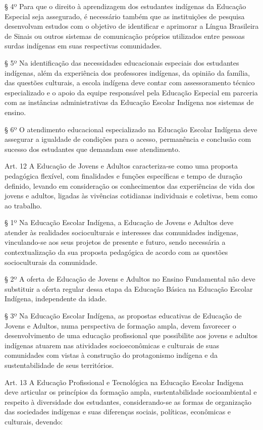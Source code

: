 \documentclass[
]{book}
\begin{document}
§ 4º Para que o direito à aprendizagem dos estudantes indígenas da Educação Especial seja assegurado, é necessário também que as instituições de pesquisa desenvolvam estudos com o objetivo de identificar e aprimorar a Língua Brasileira de Sinais ou outros sistemas de comunicação próprios utilizados entre pessoas surdas indígenas em suas respectivas comunidades.

§ 5º Na identificação das necessidades educacionais especiais dos estudantes indígenas, além da experiência dos professores indígenas, da opinião da família, das questões culturais, a escola indígena deve contar com assessoramento técnico especializado e o apoio da equipe responsável pela Educação Especial em parceria com as instâncias administrativas da Educação Escolar Indígena nos sistemas de ensino.

§ 6º O atendimento educacional especializado na Educação Escolar Indígena deve assegurar a igualdade de condições para o acesso, permanência e conclusão com sucesso dos estudantes que demandam esse atendimento.

Art. 12 A Educação de Jovens e Adultos caracteriza-se como uma proposta pedagógica flexível, com finalidades e funções específicas e tempo de duração definido, levando em consideração os conhecimentos das experiências de vida dos jovens e adultos, ligadas às vivências cotidianas individuais e coletivas, bem como ao trabalho.

§ 1º Na Educação Escolar Indígena, a Educação de Jovens e Adultos deve atender às realidades socioculturais e interesses das comunidades indígenas, vinculando-se aos seus projetos de presente e futuro, sendo necessária a contextualização da sua proposta pedagógica de acordo com as questões socioculturais da comunidade.

§ 2º A oferta de Educação de Jovens e Adultos no Ensino Fundamental não deve substituir a oferta regular dessa etapa da Educação Básica na Educação Escolar Indígena, independente da idade.

§ 3º Na Educação Escolar Indígena, as propostas educativas de Educação de Jovens e Adultos, numa perspectiva de formação ampla, devem favorecer o desenvolvimento de uma educação profissional que possibilite aos jovens e adultos indígenas atuarem nas atividades socioeconômicas e culturais de suas comunidades com vistas à construção do protagonismo indígena e da sustentabilidade de seus territórios.

Art. 13 A Educação Profissional e Tecnológica na Educação Escolar Indígena deve articular os princípios da formação ampla, sustentabilidade socioambiental e respeito à diversidade dos estudantes, considerando-se as formas de organização das sociedades indígenas e suas diferenças sociais, políticas, econômicas e culturais, devendo:
\end{document}
